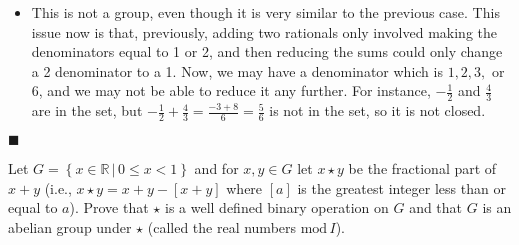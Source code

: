 \documentclass[12pt]{article}
\renewcommand{\qed}{\hfill$\blacksquare$}
\renewenvironment{proof}{\begin{addmargin}[1em]{0em}\begin{newproof}}{\end{newproof}\end{addmargin}\qed}
\newenvironment{problem}[2][Exercise]{\begin{trivlist}
\item[\hskip \labelsep {\bfseries #1}\hskip \labelsep {\bfseries #2.}]}{\end{trivlist}}
\begin{document}
\begin{proof}
\begin{itemize}
    \item This is not a group, even though it is very similar to the previous case. This issue now is that, previously, adding two rationals only involved making the denominators equal to 1 or 2, and then reducing the sums could only change a 2 denominator to a 1. Now, we may have a denominator which is $1,2,3,$ or $6$, and we may not be able to reduce it any further. For instance, $-\frac{1}{2}$ and $\frac{4}{3}$ are in the set, but $-\frac{1}{2}+\frac{4}{3} = \frac{-3+8}{6}=\frac{5}{6}$ is not in the set, so it is not closed.
\end{itemize}
\end{proof}






\begin{problem}{1.1.7}
Let $G=\left\{ x\in\mathbb{R} \, | \, 0\leq x < 1\right\}$ and for $x,y\in G$ let $x\star y$ be the fractional part of $x+y$ (i.e., $x\star y = x+y - \left[x+y\right]$ where $\left[a\right]$ is the greatest integer less than or equal to $a$). Prove that $\star$ is a well defined binary operation on $G$ and that $G$ is an abelian group under $\star$ (called the real numbers $\text{mod} \, I$).
\end{problem}
\end{document}
